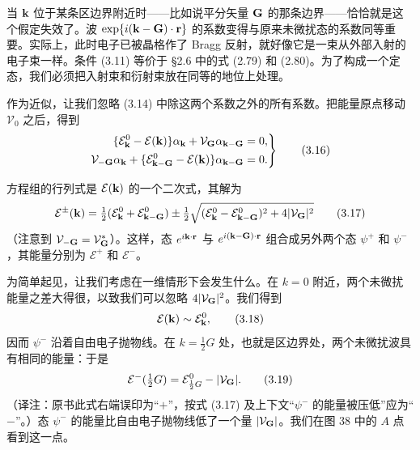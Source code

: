 当 ${\bf k}$ 位于某条区边界附近时——比如说平分矢量 ${\bf G}$ 的那条边界——恰恰就是这个假定失效了。波 $\exp\{i({\bf k}-{\bf G})\cdot{\bf r}\}$ 的系数变得与原来未微扰态的系数同等重要。实际上，此时电子已被晶格作了 Bragg 反射，就好像它是一束从外部入射的电子束一样。条件 (3.11) 等价于 §2.6 中的式 (2.79) 和 (2.80)。为了构成一个定态，我们必须把入射束和衍射束放在同等的地位上处理。

作为近似，让我们忽略 (3.14) 中除这两个系数之外的所有系数。把能量原点移动 $\mathcal{V}_{0}$ 之后，得到
\begin{equation*}
\left.\begin{aligned}
\{\mathcal{E}_{\bf k}^{0}-\mathcal{E}({\bf k})\}\alpha_{\bf k}+\mathcal{V}_{\bf G}\alpha_{\bf k-{\bf G}}&=0,\\
\mathcal{V}_{-{\bf G}}\alpha_{\bf k}+\{\mathcal{E}_{\bf k-{\bf G}}^{0}-\mathcal{E}({\bf k})\}\alpha_{\bf k-{\bf G}}&=0.
\end{aligned}\right\}
\tag{3.16}
\end{equation*}

方程组的行列式是 $\mathcal{E}({\bf k})$ 的一个二次式，其解为
\begin{equation*}
\mathcal{E}^{\pm}({\bf k})=\tfrac{1}{2}(\mathcal{E}_{\bf k}^{0}+\mathcal{E}_{\bf k-{\bf G}}^{0})\pm\tfrac{1}{2}\sqrt{(\mathcal{E}_{\bf k}^{0}-\mathcal{E}_{\bf k-{\bf G}}^{0})^{2}+4|\mathcal{V}_{\bf G}|^{2}}
\tag{3.17}
\end{equation*}
（注意到 $\mathcal{V}_{-{\bf G}}=\mathcal{V}_{\bf G}^{*}$）。这样，态 $e^{i{\bf k}\cdot{\bf r}}$ 与 $e^{i({\bf k}-{\bf G})\cdot{\bf r}}$ 组合成另外两个态 $\psi^{+}$ 和 $\psi^{-}$，其能量分别为 $\mathcal{E}^{+}$ 和 $\mathcal{E}^{-}$。

为简单起见，让我们考虑在一维情形下会发生什么。在 $k=0$ 附近，两个未微扰能量之差大得很，以致我们可以忽略 $4|\mathcal{V}_{\bf G}|^{2}$。我们得到
\begin{equation*}
\mathcal{E}({\bf k})\sim\mathcal{E}_{\bf k}^{0},
\tag{3.18}
\end{equation*}
因而 $\psi^{-}$ 沿着自由电子抛物线。在 $k=\frac{1}{2}G$ 处，也就是区边界处，两个未微扰波具有相同的能量：于是
\begin{equation*}
\mathcal{E}^{-}(\tfrac{1}{2}G)=\mathcal{E}_{\frac{1}{2}G}^{0}-|\mathcal{V}_{\bf G}|.
\tag{3.19}
\end{equation*}
（译注：原书此式右端误印为“$+$”，按式 (3.17) 及上下文“$\psi^{-}$ 的能量被压低”应为“$-$”。）态 $\psi^{-}$ 的能量比自由电子抛物线低了一个量 $|\mathcal{V}_{\bf G}|$。我们在图 38 中的 $A$ 点看到这一点。

